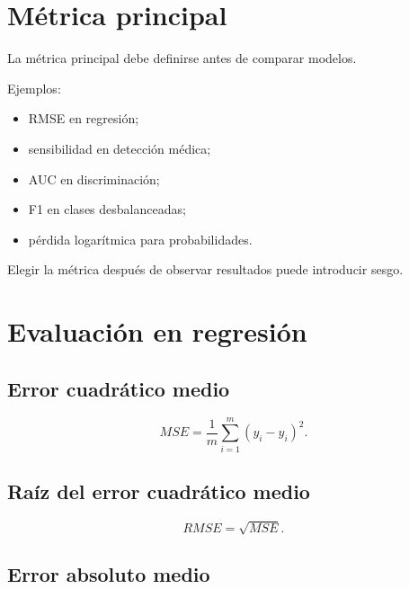 \documentclass[
  spanish,
  10.5pt,
  letterpaper,
  DIV=11,
  numbers=noendperiod,
  oneside,
  open=any]{scrreprt}
\providecommand{\tightlist}{%
  \setlength{\itemsep}{0pt}\setlength{\parskip}{0pt}}
\theoremstyle{definition}
\theoremstyle{definition}
\theoremstyle{plain}
\theoremstyle{remark}
\begin{document}
\section*{Métrica principal}\label{muxe9trica-principal}


La métrica principal debe definirse antes de comparar modelos.

Ejemplos:

\begin{itemize}
\tightlist
\item
  RMSE en regresión;
\item
  sensibilidad en detección médica;
\item
  AUC en discriminación;
\item
  F1 en clases desbalanceadas;
\item
  pérdida logarítmica para probabilidades.
\end{itemize}

Elegir la métrica después de observar resultados puede introducir sesgo.

\section*{Evaluación en regresión}\label{evaluaciuxf3n-en-regresiuxf3n}


\subsection*{Error cuadrático medio}\label{error-cuadruxe1tico-medio-1}

\[
MSE
=
\frac{1}{m}
\sum_{i=1}^{m}
(
y_i-\widehat{y}_i
)^2.
\]

\subsection*{Raíz del error cuadrático
medio}\label{rauxedz-del-error-cuadruxe1tico-medio}

\[
RMSE
=
\sqrt{MSE}.
\]

\subsection*{Error absoluto medio}\label{error-absoluto-medio}
\end{document}
